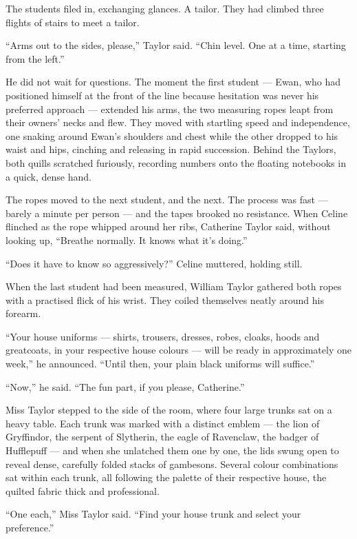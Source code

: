 The students filed in, exchanging glances. A tailor. They had climbed three flights of stairs to meet a tailor.
 
\enquote{Arms out to the sides, please,} Taylor said. \enquote{Chin level. One at a time, starting from the left.}
 
He did not wait for questions. The moment the first student --- Ewan, who had positioned himself at the front of the line because hesitation was never his preferred approach --- extended his arms, the two measuring ropes leapt from their owners' necks and flew. They moved with startling speed and independence, one snaking around Ewan's shoulders and chest while the other dropped to his waist and hips, cinching and releasing in rapid succession. Behind the Taylors, both quills scratched furiously, recording numbers onto the floating notebooks in a quick, dense hand.
 
The ropes moved to the next student, and the next. The process was fast --- barely a minute per person --- and the tapes brooked no resistance. When Celine flinched as the rope whipped around her ribs, Catherine Taylor said, without looking up, \enquote{Breathe normally. It knows what it's doing.}
 
\enquote{Does it have to know so aggressively?} Celine muttered, holding still.
 
When the last student had been measured, William Taylor gathered both ropes with a practised flick of his wrist. They coiled themselves neatly around his forearm.
 
\enquote{Your house uniforms --- shirts, trousers, dresses, robes, cloaks, hoods and greatcoats, in your respective house colours --- will be ready in approximately one week,} he announced. \enquote{Until then, your plain black uniforms will suffice.}
 
\enquote{Now,} he said. \enquote{The fun part, if you please, Catherine.}
 
Miss Taylor stepped to the side of the room, where four large trunks sat on a heavy table. Each trunk was marked with a distinct emblem --- the lion of Gryffindor, the serpent of Slytherin, the eagle of Ravenclaw, the badger of Hufflepuff --- and when she unlatched them one by one, the lids swung open to reveal dense, carefully folded stacks of gambesons. Several colour combinations sat within each trunk, all following the palette of their respective house, the quilted fabric thick and professional.
 
\enquote{One each,} Miss Taylor said. \enquote{Find your house trunk and select your preference.}
 
